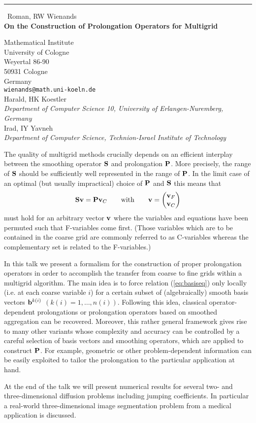 \documentclass{report}
\begin{document}
\begin{center}
\rule{6in}{1pt} \
{\large Roman, RW Wienands \\
{\bf On the Construction of Prolongation Operators for Multigrid}}

Mathematical Institute \\ University of Cologne \\ Weyertal 86-90 \\ 50931 Cologne \\ Germany
\\
{\tt wienands@math.uni-koeln.de}\\
Harald, HK Koestler\\
{\em Department of Computer Science 10, University of Erlangen-Nuremberg, Germany}\\
Irad, IY Yavneh\\
{\em Department of Computer Science, Technion-Israel Institute of Technology}\end{center}

\def\bfP{{\bf P}}
\def\bfS{{\bf S}}
\def\bfv{{\bf v}}
\def\bfb{{\bf b}}
The quality of multigrid methods crucially depends on an efficient
interplay between the smoothing operator $\bfS$ and prolongation $\bfP$.
More precisely, the range of $\bfS$ should be sufficiently well
represented in the range of $\bfP$. In the limit case of an optimal (but
usually impractical) choice of $\bfP$ and $\bfS$ this means that
\begin{equation}
\bfS \bfv = \bfP \bfv_{C} \qquad \text{with}
\qquad \bfv = \left( \begin{matrix} \bfv_{F} \\ \bfv_{C}
\end{matrix} \right) \label{eq:basiseq}
\end{equation}
must hold for an arbitrary vector $\bfv$ where the variables and
equations have been permuted such that F-variables come first.
(Those variables which are to be contained in the coarse grid are
commonly referred to as C-variables whereas the complementary set is
related to the F-variables.)

In this talk we present a formalism for the construction of proper
prolongation operators in order to accomplish the transfer from coarse to
fine grids within a multigrid algorithm. The main idea is to force
relation
(\ref{eq:basiseq}) only locally (i.e. at each coarse variable $i$) for a
certain subset of (algebraically) smooth basis vectors $\bfb^{k(i)}$
$(k(i) = 1,\dots,n(i))$. Following this
idea, classical operator-dependent prolongations or prolongation
operators based on smoothed aggregation can be recovered. Moreover, this
rather general framework gives rise to many other variants whose
complexity and accuracy can be controlled by a careful selection of basis
vectors and smoothing operators, which are applied to construct $\bfP$.
For example, geometric or other problem-dependent information can be
easily exploited to tailor the prolongation to the particular application
at hand.

At the end of the talk we will present numerical results for several two-
and three-dimensional diffusion problems including jumping coefficients.
In particular a real-world three-dimensional image segmentation problem
from a medical application is discussed.
\end{document}
